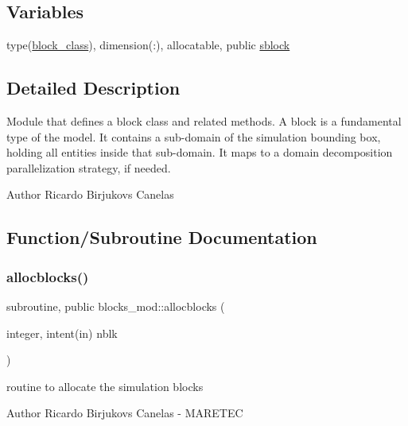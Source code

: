 \subsection*{Variables}
\begin{DoxyCompactItemize}
\item 
type(\mbox{\hyperlink{structblocks__mod_1_1block__class}{block\+\_\+class}}), dimension(\+:), allocatable, public \mbox{\hyperlink{namespaceblocks__mod_a13b3fc755dfbf3e333490a3f931b28aa}{sblock}}
\end{DoxyCompactItemize}


\subsection{Detailed Description}
Module that defines a block class and related methods. A block is a fundamental type of the model. It contains a sub-\/domain of the simulation bounding box, holding all entities inside that sub-\/domain. It maps to a domain decomposition parallelization strategy, if needed. 

\begin{DoxyAuthor}{Author}
Ricardo Birjukovs Canelas 
\end{DoxyAuthor}


\subsection{Function/\+Subroutine Documentation}
\mbox{\label{namespaceblocks__mod_a639beb0fee2290d46353f4b4702d6711}} 
\subsubsection{\texorpdfstring{allocblocks()}{allocblocks()}}
{\footnotesize\ttfamily subroutine, public blocks\+\_\+mod\+::allocblocks (\begin{DoxyParamCaption}\item[{integer, intent(in)}]{nblk }\end{DoxyParamCaption})}



routine to allocate the simulation blocks 

\begin{DoxyAuthor}{Author}
Ricardo Birjukovs Canelas -\/ M\+A\+R\+E\+T\+EC 
\end{DoxyAuthor}

